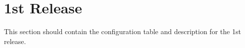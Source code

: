 \section{1st Release}
This section should contain the configuration table and description for the 1st release.